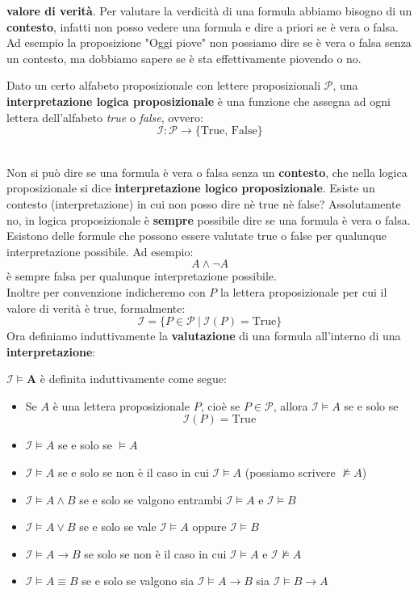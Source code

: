 \textbf{valore di verità}. Per valutare la verdicità di una formula abbiamo bisogno di un \textbf{contesto}, infatti non posso vedere una formula e 
dire a priori se è vera o falsa. Ad esempio la proposizione "Oggi piove" non possiamo dire se è vera o falsa senza un contesto,
ma dobbiamo sapere se è sta effettivamente piovendo o no.\smallskip\\
\colorbox{SALZO}{\parbox{\dimexpr\linewidth-2\fboxsep}{\begin{definition}
   Dato un certo alfabeto proposizionale con lettere proposizionali $\mathcal{P}$, una \textbf{interpretazione logica proposizionale} è una funzione che assegna ad ogni lettera 
   dell'alfabeto \textit{true} o \textit{false}, ovvero:
   \[  \mathcal{I} : \mathcal{P} \to \{ \text{True, False}\}  \]
\end{definition}}}\smallskip\\
Non si può dire se una formula è vera o falsa senza un \textbf{contesto}, che nella logica proposizionale si dice \textbf{interpretazione logico proposizionale}.
Esiste un contesto (interpretazione) in cui non posso dire nè true nè false? Assolutamente no, in logica proposizionale
è \textbf{sempre} possibile dire se una formula è vera o falsa. Esistono delle formule che possono essere valutate true o false 
per qualunque interpretazione possibile. Ad esempio:
\[   A \wedge \neg A  \]
è sempre falsa per qualunque interpretazione possibile.\\
Inoltre per convenzione indicheremo con $P$ la lettera proposizionale per cui il valore di verità è true, formalmente:
\[\mathcal{I} = \{ P \in \mathcal{P} \ | \ \mathcal{I}(P) = \text{True}    \}\]
Ora definiamo induttivamente la \textbf{valutazione} di una formula all'interno di una \textbf{interpretazione}:\smallskip\\
\colorbox{SALZO}{\parbox{\dimexpr\linewidth-2\fboxsep}{\begin{definition}
   $\mathcal{I} \bm{\models A}$ è definita induttivamente come segue:
   \begin{itemize}
    \item Se $A$ è una lettera proposizionale $P$, cioè se $P \in \mathcal{P}$, allora $\mathcal{I}\models A$ se e solo se
    \[  \mathcal{I}(P) = \text{True}   \]
    \item $\mathcal{I}\models A$ se e solo se $\models A$
    \item $\mathcal{I}\models A$ se e solo se non è il caso in cui $\mathcal{I}\models A$ (possiamo scrivere $\not\models A$)
    \item $\mathcal{I}\models A \wedge B$ se e solo se valgono entrambi $\mathcal{I}\models A$ e $\mathcal{I}\models B$ 
    \item $\mathcal{I}\models A \vee B$ se e solo se vale $\mathcal{I}\models A$ oppure $\mathcal{I}\models B$
    \item $\mathcal{I}\models A\to B$ se solo se non è il caso in cui $\mathcal{I}\models A$ e $\mathcal{I} \not\models A$
    \item $\mathcal{I}\models A\equiv B$ se e solo se valgono sia $\mathcal{I}\models A\to B$ sia $\mathcal{I}\models B \to A$
   \end{itemize}
\end{definition}}}\smallskip\\
